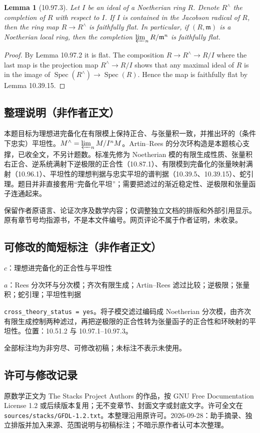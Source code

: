 \documentclass[UTF8,11pt]{ctexart}
\newtheorem*{lemma}{Lemma}
\theoremstyle{definition}
\DeclareMathOperator{\Spec}{Spec}
\begin{document}
\begin{lemma}[10.97.3]
Let $I$ be an ideal of a Noetherian ring $R$. Denote $R^\wedge$ the completion of $R$ with respect to $I$. If $I$ is contained in the Jacobson radical of $R$, then the ring map $R\to R^\wedge$ is faithfully flat. In particular, if $(R,\mathfrak m)$ is a Noetherian local ring, then the completion $\varprojlim_nR/\mathfrak m^n$ is faithfully flat.
\end{lemma}
\begin{proof}
By Lemma 10.97.2 it is flat. The composition $R\to R^\wedge\to R/I$ where the last map is the projection map $R^\wedge\to R/I$ shows that any maximal ideal of $R$ is in the image of $\Spec(R^\wedge)\to\Spec(R)$. Hence the map is faithfully flat by Lemma 10.39.15.
\end{proof}

\subsection*{整理说明（非作者正文）}
本题目标为理想进完备化在有限模上保持正合、与张量积一致，并推出环的（条件下忠实）平坦性。$M^\wedge=\varprojlim_nM/I^nM$。Artin--Rees 的分次环构造是本题核心支撑，已收全文，不另计题数。标准先修为 Noetherian 模的有限生成性质、张量积右正合、逆系统满射下逆极限的正合性（10.87.1）、有限模到完备化的张量映射满射（10.96.1）、平坦性的理想判据与忠实平坦的谱判据（10.39.5、10.39.15）、蛇引理。题目并非直接套用“完备化平坦”；需要把滤过的渐近稳定性、逆极限和张量函子连通起来。

保留作者原语言、论证次序及数学内容；仅调整独立文档的排版和外部引用显示。原有章节号均指源书，不是本文件编号。网页评论不属于作者证明，未收录。
\subsection*{可修改的简短标注（非作者正文）}
$c$：理想进完备化的正合性与平坦性

$a$：Rees 分次环与分次模；齐次有限生成；Artin--Rees 滤过比较；逆极限；张量积；蛇引理；平坦性判据

\texttt{cross\_theory\_status = yes}。将子模交滤过编码成 Noetherian 分次模，由齐次有限生成控制两种滤过，再把逆极限的正合性转为张量函子的正合性和环映射的平坦性。位置：10.51.2 与 10.97.1--10.97.3。

全部标注均为非穷尽、可修改初稿；未标注不表示未使用。
\subsection*{许可与修改记录}
原数学正文为 The Stacks Project Authors 的作品，按 GNU Free Documentation License 1.2 或后续版本复用；无不变章节、封面文字或封底文字。许可全文在 \texttt{sources/stacks/GFDL-1.2.txt}。本整理沿用原许可。2026-09-28：助手摘录、独立排版并加入来源、范围说明与初稿标注；不暗示原作者认可本次整理。
\end{document}
